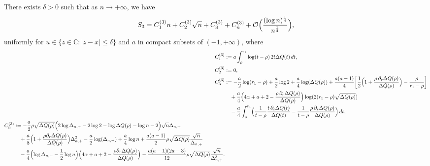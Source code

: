 \documentclass[10pt,a4paper]{amsart}
\newcommand{\C}{\mathds{C}}
\begin{document}
\begin{lemma}\label{lemma:S3}
There exists $\delta>0$ such that as $n\to+\infty$, we have 
\begin{equation}
\label{def of S3 asymptotics}
 S_3=
 C_1^{(3)}n+C_2^{(3)}\sqrt{n}+C_3^{(3)}+C_n^{(3)}+\mathcal{O}\Bigl(\frac{(\log n)^{\frac{1}{4}}}{n^{\frac{1}{4}}}\Bigr),
\end{equation}
uniformly for $u\in\{z\in\C:|z-x|\leq \delta\}$ and $a$ in compact subsets of $(-1,+\infty)$, where 
\begin{align*}
C_1^{(3)}&:=
a\int_{\rho}^{r_1}\log (t-\rho)\,2t\Delta Q(t)\,dt,
\\
C_2^{(3)}&:=0, 
\\
C_3^{(3)}&:=
-\frac{a}{2}\log(r_1-\rho)
+\frac{a}{2}\log2
+\frac{a}{4}\log(\Delta Q(\rho))
+\frac{a(a-1)}{4}\bigg[\frac{1}{2}\Bigl(1+\frac{\rho\,\partial_r\Delta Q(\rho)}{\Delta Q(\rho)}\Bigr)-\frac{\rho}{r_1-\rho}\bigg]
\\
&\quad
+\frac{a}{4}\Bigl(4\alpha+a+2-\frac{\rho\,\partial_r\Delta Q(\rho)}{\Delta Q(\rho)}\Bigr)\log(2(r_1-\rho)\sqrt{\Delta Q(\rho)})
\\
&\quad
-\frac{a}{4}\int_{\rho}^{r_1}\Bigl(\frac{1}{t-\rho}\frac{t\,\partial_t\Delta Q(t)}{\Delta Q(t)}-\frac{1}{t-\rho}\frac{\rho\,\partial_r\Delta Q(\rho)}{\Delta Q(\rho)}\Bigr)\,dt, 
\\
\begin{split}
C_n^{(3)}&:=
-\frac{a}{2}\rho\sqrt{\Delta Q(\rho)}
\Bigl( 
2\log\Delta_{n,+}-2\log 2-\log\Delta Q(\rho)-\log n-2
\Bigr)\sqrt{n}\Delta_{n,+}
\\
&\quad
+\frac{a}{8}\Bigl(1+\frac{\rho\partial_r\Delta Q(\rho)}{\Delta Q(\rho)}\Bigr)\Delta_{n,+}^2
-\frac{a}{2}\log(\Delta_{n,+})
+\frac{a}{4}\log n
+\frac{a(a-1)}{2}\rho\sqrt{\Delta Q(\rho)}\frac{\sqrt{n}}{\Delta_{n,+}}
\\
&\quad
-\frac{a}{4}
\Bigl( 
\log\Delta_{n,+}-\frac{1}{2}\log n
\Bigr)
\Bigl(
4\alpha+a+2-\frac{\rho\partial_r\Delta Q(\rho)}{\Delta Q(\rho)}
\Bigr)
-\frac{a(a-1)(2a-3)}{12}\rho\sqrt{\Delta Q(\rho)}\frac{\sqrt{n}}{\Delta_{n,+}^3}. 
\end{split}
\end{align*}


\end{lemma}
\end{document}
